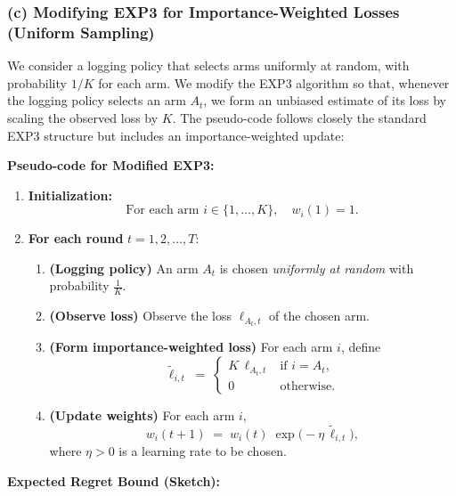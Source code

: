 \bigskip
\noindent
\subsubsection*{(c) Modifying EXP3 for Importance-Weighted Losses (Uniform Sampling)}

We consider a logging policy that selects arms uniformly at random, 
with probability $1/K$ for each arm. 
We modify the EXP3 algorithm so that, whenever the logging policy selects an arm $A_t$, 
we form an unbiased estimate of its loss by scaling the observed loss by $K$. 
The pseudo-code follows closely the standard EXP3 structure but includes an importance-weighted update:

\bigskip
\noindent
\textbf{Pseudo-code for Modified EXP3:}

\begin{enumerate}
    \item \textbf{Initialization:} 
    \[
        \text{For each arm } i \in \{1,\dots,K\},\quad w_i(1) = 1.
    \]
    \item \textbf{For each round } $t = 1,2,\dots,T$:
    \begin{enumerate}
        \item \textbf{(Logging policy)} An arm $A_t$ is chosen \emph{uniformly at random} with probability $\frac{1}{K}$.
        \item \textbf{(Observe loss)} Observe the loss $\ell_{A_t,t}$ of the chosen arm.
        \item \textbf{(Form importance-weighted loss)} For each arm $i$, define
        \[
            \tilde{\ell}_{i,t} \;=\;
            \begin{cases}
            K \,\ell_{A_t,t} & \text{if } i = A_t, \\
            0 & \text{otherwise}.
            \end{cases}
        \]
        \item \textbf{(Update weights)} For each arm $i$,
        \[
            w_i(t+1) \;=\; w_i(t) \;\exp\bigl(-\eta\,\tilde{\ell}_{i,t}\bigr),
        \]
        where $\eta > 0$ is a learning rate to be chosen.
    \end{enumerate}
\end{enumerate}

\bigskip
\noindent
\textbf{Expected Regret Bound (Sketch):} 

